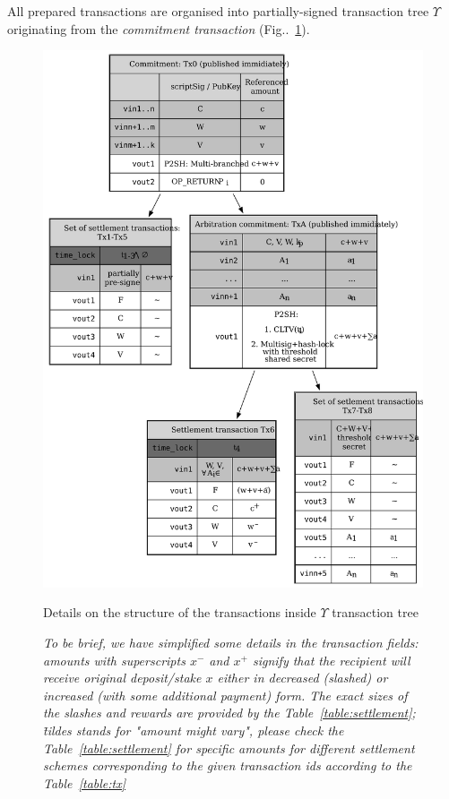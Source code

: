 \documentclass[a4paper]{article}
\begin{document}
All prepared transactions are organised into partially-signed transaction tree $\Upsilon$ originating from the \textit{commitment transaction} (Fig..~\ref{fig:txtree}).

\begin{figure}[h!]
    \centering
    \includegraphics[width=0.9\columnwidth]{assets/txtree.pdf}
    \caption{Details on the structure of the transactions inside $\Upsilon$ transaction tree}
    \caption*{\textit{To be brief, we have simplified some details in the transaction fields:
amounts with superscripts $x^-$ and $x^+$ signify that the recipient will receive  original deposit/stake $x$ either in decreased (slashed) or increased (with some additional payment) form. The exact sizes of the slashes and rewards are provided by the Table~\ref{table:settlement};
\~ tildes stands for "amount might vary", please check the Table~\ref{table:settlement} for specific amounts for different settlement schemes corresponding to the given transaction ids according to the Table~\ref{table:tx}}}
    \label{fig:txtree}
\end{figure}
\end{document}
